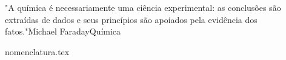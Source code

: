 \documentclass[a4paper, 11pt, twoside]{book}
\newcommand{\capQui}{3}				%
\begin{document}
	\begin{parte}{"A química é necessariamente uma ciência experimental: as conclusões são extraídas de dados e seus princípios são apoiados pela evidência dos fatos."}{Michael Faraday}{Química}
		\capitulos{\pathquimica}{\capQui}
	\end{parte}
	
	\backmatter
	
	{nomenclatura.tex} 
	
	\printindex
	
	\nocite{*}
	
	
	
\end{document}
